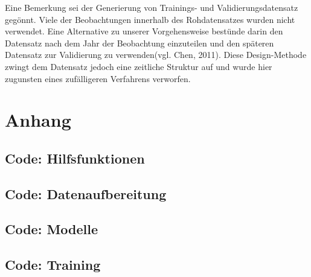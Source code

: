 \documentclass{article}
\begin{document}
Eine Bemerkung sei der Generierung von Trainings- und Validierungsdatensatz geg{\"o}nnt. Viele der Beobachtungen innerhalb des Rohdatensatzes wurden nicht verwendet. Eine Alternative zu unserer Vorgehensweise best{\"u}nde darin den Datensatz nach dem Jahr der Beobachtung einzuteilen und den sp{\"a}teren Datensatz zur Validierung zu verwenden(vgl. Chen, 2011). Diese Design-Methode zwingt dem Datensatz jedoch eine zeitliche Struktur auf und wurde hier zugunsten eines zuf{\"a}lligeren Verfahrens verworfen.

\section{Anhang}
\subsection{Code: Hilfsfunktionen}



\subsection{Code: Datenaufbereitung}


\subsection{Code: Modelle}

\subsection{Code: Training}

\end{document}
